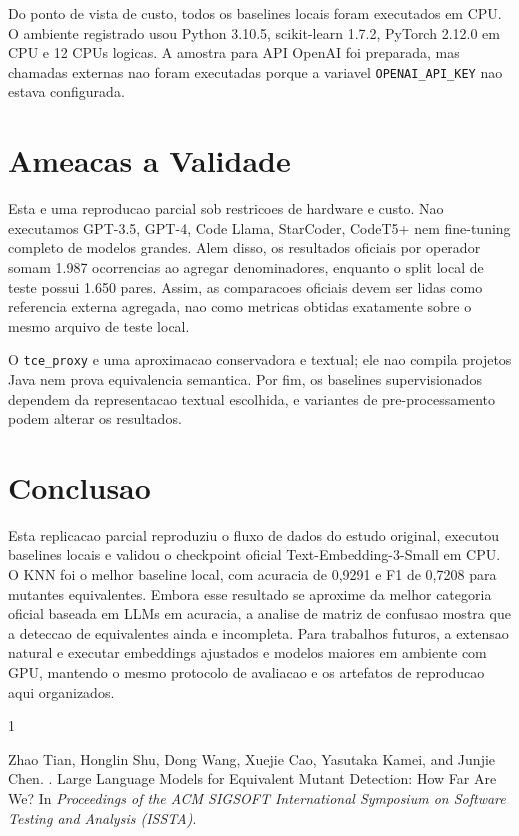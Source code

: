 \documentclass[sigconf,screen,nonacm]{acmart}
\begin{document}
Do ponto de vista de custo, todos os baselines locais foram executados em CPU. O ambiente registrado usou Python 3.10.5, scikit-learn 1.7.2, PyTorch 2.12.0 em CPU e 12 CPUs logicas. A amostra para API OpenAI foi preparada, mas chamadas externas nao foram executadas porque a variavel \texttt{OPENAI\_API\_KEY} nao estava configurada.

\section{Ameacas a Validade}

Esta e uma reproducao parcial sob restricoes de hardware e custo. Nao executamos GPT-3.5, GPT-4, Code Llama, StarCoder, CodeT5+ nem fine-tuning completo de modelos grandes. Alem disso, os resultados oficiais por operador somam 1.987 ocorrencias ao agregar denominadores, enquanto o split local de teste possui 1.650 pares. Assim, as comparacoes oficiais devem ser lidas como referencia externa agregada, nao como metricas obtidas exatamente sobre o mesmo arquivo de teste local.

O \texttt{tce\_proxy} e uma aproximacao conservadora e textual; ele nao compila projetos Java nem prova equivalencia semantica. Por fim, os baselines supervisionados dependem da representacao textual escolhida, e variantes de pre-processamento podem alterar os resultados.

\section{Conclusao}

Esta replicacao parcial reproduziu o fluxo de dados do estudo original, executou baselines locais e validou o checkpoint oficial Text-Embedding-3-Small em CPU. O KNN foi o melhor baseline local, com acuracia de 0,9291 e F1 de 0,7208 para mutantes equivalentes. Embora esse resultado se aproxime da melhor categoria oficial baseada em LLMs em acuracia, a analise de matriz de confusao mostra que a deteccao de equivalentes ainda e incompleta. Para trabalhos futuros, a extensao natural e executar embeddings ajustados e modelos maiores em ambiente com GPU, mantendo o mesmo protocolo de avaliacao e os artefatos de reproducao aqui organizados.



\begin{thebibliography}{1}

Zhao Tian, Honglin Shu, Dong Wang, Xuejie Cao, Yasutaka Kamei, and Junjie Chen.
.
\newblock Large Language Models for Equivalent Mutant Detection: How Far Are We?
\newblock In \emph{Proceedings of the ACM SIGSOFT International Symposium on Software Testing and Analysis (ISSTA)}.

\end{thebibliography}
\end{document}
